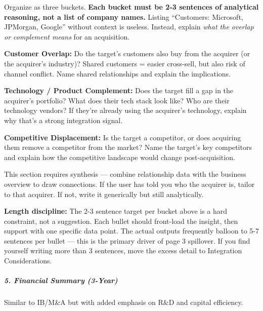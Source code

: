 \documentclass[11pt]{article}
\begin{document}
Organize as three buckets. \textbf{Each bucket must be 2-3 sentences of analytical reasoning, not a list of company names.} Listing ``Customers: Microsoft, JPMorgan, Google'' without context is useless. Instead, explain \emph{what the overlap or complement means} for an acquisition.


\textbf{Customer Overlap:} Do the target's customers also buy from the acquirer (or the acquirer's industry)? Shared customers = easier cross-sell, but also risk of channel conflict. Name shared relationships and explain the implications.


\textbf{Technology / Product Complement:} Does the target fill a gap in the acquirer's portfolio? What does their tech stack look like? Who are their technology vendors? If they're already using the acquirer's technology, explain why that's a strong integration signal.


\textbf{Competitive Displacement:} Is the target a competitor, or does acquiring them remove a competitor from the market? Name the target's key competitors and explain how the competitive landscape would change post-acquisition.


This section requires synthesis — combine relationship data with the business overview to draw connections. If the user has told you who the acquirer is, tailor to that acquirer. If not, write it generically but still analytically.


\textbf{Length discipline:} The 2-3 sentence target per bucket above is a hard constraint, not a suggestion. Each bullet should front-load the insight, then support with one specific data point. The actual outputs frequently balloon to 5-7 sentences per bullet — this is the primary driver of page 3 spillover. If you find yourself writing more than 3 sentences, move the excess detail to Integration Considerations.


\subparagraph{5. Financial Summary (3-Year)}\mbox{}\par
Similar to IB/M\&A but with added emphasis on R\&D and capital efficiency.
\end{document}
